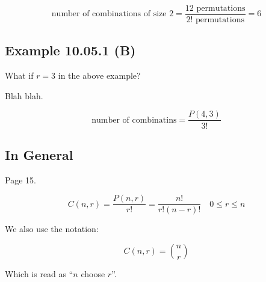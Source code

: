 \documentclass{article}
\begin{document}
\[
\text{number of combinations of size $2$} = \frac{12\text{ permutations}}{2!\text{ permutations}}=6
\]

\subsection*{Example 10.05.1 (B)}

What if $r=3$ in the above example?

Blah blah.

\[
\text{number of combinatins} = \frac{P(4,3)}{3!}
\]

\subsection*{In General}

Page 15.

\[
C(n,r)=\frac{P(n,r)}{r!}=\frac{n!}{r!(n-r)!}\quad 0\le r\le n
\]

We also use the notation:

\[
C(n,r)=\binom{n}{r}
\]

Which is read as ``$n$ choose $r$''.
\end{document}
